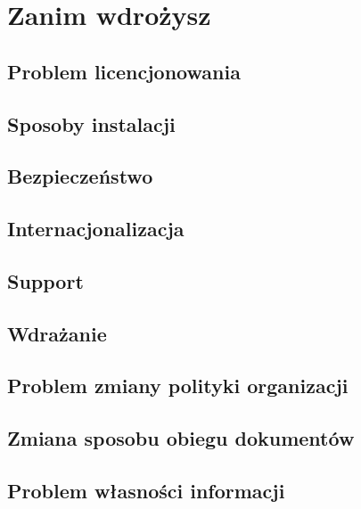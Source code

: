 \documentclass{article}
\begin{document}
\section{Zanim wdrożysz}
	\subsection {Problem licencjonowania}
	\subsection{Sposoby instalacji}
	\subsection{Bezpieczeństwo}
	\subsection{Internacjonalizacja}
	\subsection{Support}

\subsection{Wdrażanie}
	\subsection{Problem zmiany polityki organizacji}
	\subsection{Zmiana sposobu obiegu dokumentów}
	
	\subsection{Problem własności informacji}
\end{document}
